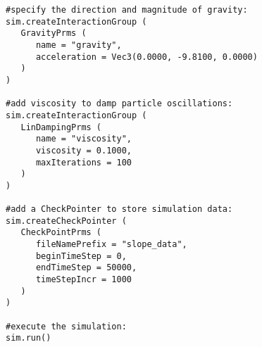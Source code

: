 \begin{verbatim}
#specify the direction and magnitude of gravity:
sim.createInteractionGroup (
   GravityPrms (
      name = "gravity",
      acceleration = Vec3(0.0000, -9.8100, 0.0000)
   )
)

#add viscosity to damp particle oscillations:
sim.createInteractionGroup (
   LinDampingPrms (
      name = "viscosity",
      viscosity = 0.1000,
      maxIterations = 100
   )
)

#add a CheckPointer to store simulation data:
sim.createCheckPointer (
   CheckPointPrms (
      fileNamePrefix = "slope_data",
      beginTimeStep = 0,
      endTimeStep = 50000,
      timeStepIncr = 1000
   )
)

#execute the simulation:
sim.run()
\end{verbatim}

